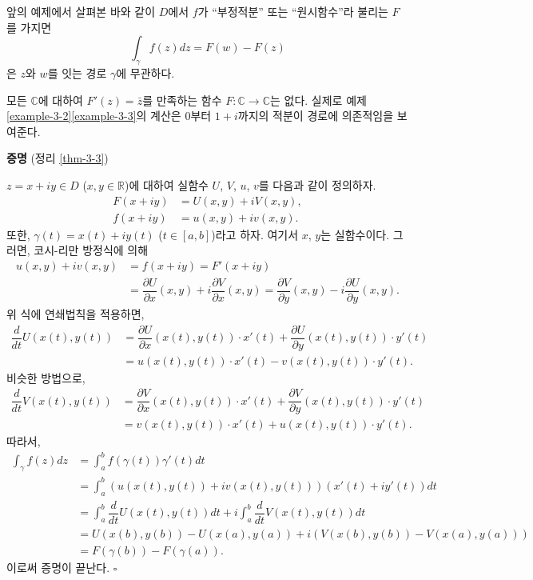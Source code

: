 앞의 예제에서 살펴본 바와 같이 
$D$에서 $f$가 ``부정적분''  또는 ``원시함수''라 불리는 $F$를 가지면
\[
\int_\gamma f(z)dz = F(w) - F(z)
\]
은 $z$와 $w$를 잇는 경로 $\gamma$에 무관하다.

\begin{saltexample}[label=example-3-6]{}{}
모든 $\mathbb C$에 대하여 
$F'(z) = \bar z$를 만족하는 함수 $F:\mathbb C \to \mathbb C$는 없다.
실제로 예제 \ref{example-3-2}\와 \ref{example-3-3}의 계산은
$0$부터 $1+i$까지의 적분이 경로에 의존적임을 보여준다.
\end{saltexample}


{\bf 증명} (정리 \ref{thm-3-3})

$z = x+iy\in D$ ($x,y\in \mathbb R$)에 대하여
실함수 $U$, $V$, $u$, $v$를 다음과 같이 정의하자.
\begin{align*}
F(x+iy) &= U(x,y) + iV(x,y), \\
f(x+iy) &= u(x,y) + iv(x,y).
\end{align*}
또한, $\gamma(t) = x(t) + iy(t)$ ($t\in[a,b]$)라고 하자.
여기서 $x$, $y$는 실함수이다.
그러면, 코시-리만 방정식에 의해
\begin{align*}
u(x,y) + iv(x,y) 
&= f(x+iy) = F'(x+iy) \\
&= \dfrac{\partial U}{\partial x}(x,y) + i \dfrac{\partial V}{\partial x}(x,y)
= \dfrac{\partial V}{\partial y}(x,y) - i \dfrac{\partial U}{\partial y}(x,y).
\end{align*}
위 식에 연쇄법칙을 적용하면,
\begin{align*}
\dfrac d{dt} U(x(t), y(t))
&= \dfrac{\partial U}{\partial x}(x(t),y(t))\cdot x'(t)
 + \dfrac{\partial U}{\partial y}(x(t),y(t))\cdot y'(t) \\
&= u(x(t),y(t))\cdot x'(t) - v(x(t),y(t))\cdot y'(t).
\end{align*}
비슷한 방법으로,
\begin{align*}
\dfrac d{dt} V(x(t), y(t))
&= \dfrac{\partial V}{\partial x}(x(t),y(t))\cdot x'(t)
 + \dfrac{\partial V}{\partial y}(x(t),y(t))\cdot y'(t) \\
&= v(x(t),y(t))\cdot x'(t) + u(x(t),y(t))\cdot y'(t).
\end{align*}
따라서,
\begin{align*}
\int_\gamma f(z)dz
&= \int_a^b f(\gamma(t))\gamma'(t)dt \\
&= \int_a^b \left( u(x(t), y(t)) + iv(x(t),y(t)) \right) (x'(t)+iy'(t))dt \\
&= \int_a^b \dfrac d{dt} U(x(t), y(t))dt + i \int_a^b \dfrac d{dt} V(x(t), y(t))dt \\
&= U(x(b), y(b)) - U(x(a), y(a)) + 
i\left( V(x(b), y(b)) - V(x(a), y(a)) \right) \\
&= F(\gamma(b)) - F(\gamma(a)).
\end{align*}
이로써 증명이 끝난다. \hfill $\square$

